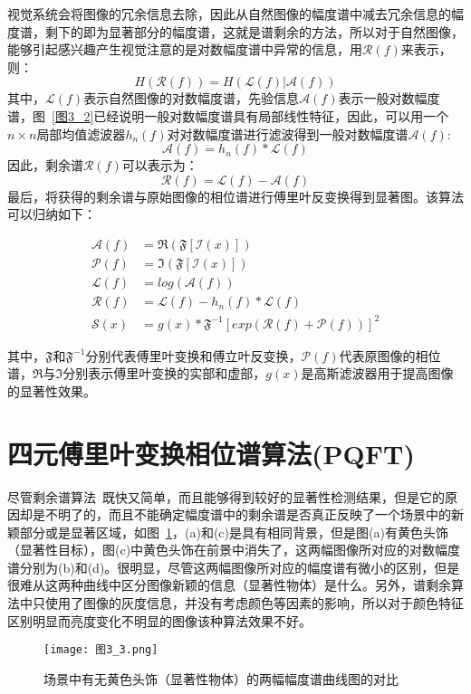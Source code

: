 视觉系统会将图像的冗余信息去除，因此从自然图像的幅度谱中减去冗余信息的幅度谱，剩下的即为显著部分的幅度谱，这就是谱剩余的方法，所以对于自然图像，能够引起感兴趣产生视觉注意的是对数幅度谱中异常的信息，用$\mathcal{R}(f)$来表示，则：
\begin{equation}
H(\mathcal{R}(f))=H(\mathcal{L}(f)|\mathcal{A}(f))
\label{式3_3}
\end{equation}
其中，$\mathcal{L}(f)$表示自然图像的对数幅度谱，先验信息$\mathcal{A}(f)$表示一般对数幅度谱，图~\ref{图3_2}已经说明一般对数幅度谱具有局部线性特征，因此，可以用一个$n \times n$局部均值滤波器${h}_{n}(f)$对对数幅度谱进行滤波得到一般对数幅度谱$\mathcal{A}(f)$:
\begin{equation}
\mathcal{A}(f)={h}_{n}(f)\ast \mathcal{L}(f)
\label{式3_4}
\end{equation}
因此，剩余谱$\mathcal{R}(f)$可以表示为：
\begin{equation}
\mathcal{R}(f)=\mathcal{L}(f)-\mathcal{A}(f)
\label{式3_5}
\end{equation}
最后，将获得的剩余谱与原始图像的相位谱进行傅里叶反变换得到显著图。该算法可以归纳如下：
\begin{linenomath}
\begin{align}
\mathcal{A}(f) &= \Re(\mathfrak{F}[\mathcal{I}(x)])\label{式3_6}\\
\mathcal{P}(f) &= \Im(\mathfrak{F}[\mathcal{I}(x)])\label{式3_7}\\
\mathcal{L}(f) &= log(\mathcal{A}(f))\label{式3_8}\\
\mathcal{R}(f) &= \mathcal{L}(f)-h_{n}(f)\ast \mathcal{L}(f) \label{式3_9}\\
\mathcal{S}(x) &= g(x)\ast \mathfrak{F}^{-1}[exp(\mathcal{R}(f)+\mathcal{P}(f))]^{2}\label{式3_10}
\end{align}
\end{linenomath}
其中，$\mathfrak{F}$和$\mathfrak{F}^{-1}$分别代表傅里叶变换和傅立叶反变换，$\mathcal{P}(f)$代表原图像的相位谱，$\Re$与$\Im$分别表示傅里叶变换的实部和虚部，$g(x)$是高斯滤波器用于提高图像的显著性效果。

\section{四元傅里叶变换相位谱算法(PQFT)}
\label{3_2}

尽管剩余谱算法~\cite{HouXiaodiCVPR2007Residual}既快又简单，而且能够得到较好的显著性检测结果，但是它的原因却是不明了的，而且不能确定幅度谱中的剩余谱是否真正反映了一个场景中的新颖部分或是显著区域，如图~\ref{图3_3}，(a)和(c)是具有相同背景，但是图(a)有黄色头饰（显著性目标），图(c)中黄色头饰在前景中消失了，这两幅图像所对应的对数幅度谱分别为(b)和(d)。很明显，尽管这两幅图像所对应的幅度谱有微小的区别，但是很难从这两种曲线中区分图像新颖的信息（显著性物体）是什么。另外，谱剩余算法中只使用了图像的灰度信息，并没有考虑颜色等因素的影响，所以对于颜色特征区别明显而亮度变化不明显的图像该种算法效果不好。
\begin{figure}[!t] %
\centering
\texttt{[image: 图3\_3.png]}
\caption{场景中有无黄色头饰（显著性物体）的两幅幅度谱曲线图的对比}
\label{图3_3}
\end{figure}

